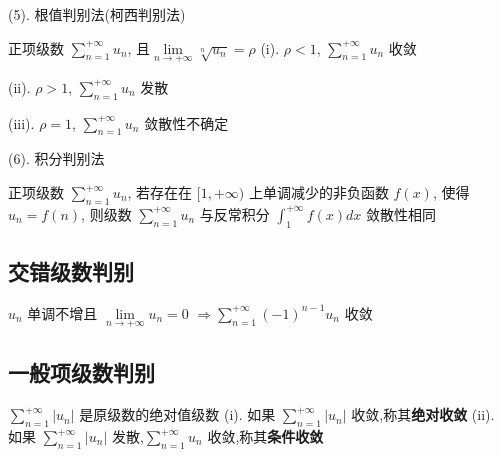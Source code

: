 (5). 根值判别法(柯西判别法)

\begin{theorem}[根值判别法]
	正项级数 $\sum\limits_{n=1}^{+\infty}u_{n}$, 且$\lim\limits_{n\to+\infty}\sqrt[n]{u_{n}}=\rho$
	(i). $\rho<1$, $\sum\limits_{n=1}^{+\infty}u_{n}$ 收敛

	(ii). $\rho>1$, $\sum\limits_{n=1}^{+\infty}u_{n}$ 发散

	(iii). $\rho=1$, $\sum\limits_{n=1}^{+\infty}u_{n}$ 敛散性不确定
\end{theorem}

(6). 积分判别法

\begin{theorem}[积分判别法]
	正项级数 $\sum\limits_{n=1}^{+\infty}u_{n}$, 若存在在 $[1,+\infty)$ 上单调减少的非负函数 $f(x)$, 
	使得 $u_{n} = f(n)$, 则级数 $\sum\limits_{n=1}^{+\infty}u_{n}$ 与反常积分 $\int_{1}^{+\infty}f(x)dx$ 敛散性相同

\end{theorem}
\subsection{交错级数判别}

\begin{theorem}[莱布尼茨判别法]
	$u_{n}$ 单调不增且 $\lim\limits_{n\to +\infty}u_{n}=0$  $\Rightarrow\sum\limits_{n=1}^{+\infty}(-1)^{n-1}u_{n}$ 收敛
\end{theorem}

\subsection{一般项级数判别}
\begin{definition}
	$\sum\limits_{n=1}^{+\infty}|u_{n}|$ 是原级数的绝对值级数
	(i). 如果 $\sum\limits_{n=1}^{+\infty}|u_{n}|$ 收敛,称其\textbf{绝对收敛}
	(ii). 如果 $\sum\limits_{n=1}^{+\infty}|u_{n}|$ 发散,$\sum\limits_{n=1}^{+\infty}u_{n}$ 收敛,称其\textbf{条件收敛}
\end{definition}
